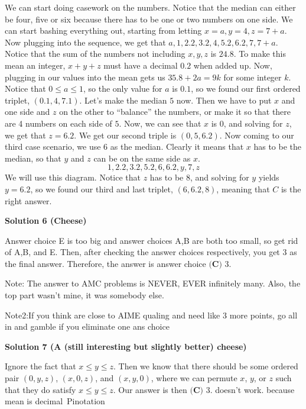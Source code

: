 \begin{enumerate}
We can start doing casework on the numbers. Notice that the median can either be four, five or six because there has to be one or two numbers on one side. We can start bashing everything out, starting from letting $x=a, y=4, z=7+a$. Now plugging into the sequence, we get that $a, 1, 2.2, 3.2, 4, 5.2, 6.2, 7, 7+a$. Notice that the sum of the numbers not including $x, y, z$ is $24.8$. To make this mean an integer, $x+y+z$ must have a decimal $0.2$ when added up. Now, plugging in our values into the mean gets us $35.8+2a=9k$ for some integer $k$. Notice that $0\leq a\leq 1$, so the only value for $a$ is $0.1$, so we found our first ordered triplet, $(0.1, 4, 7.1)$. Let’s make the median $5$ now. Then we have to put $x$ and one side and $z$ on the other to “balance” the numbers, or make it so that there are 4 numbers on each side of $5$. Now, we can see that $x$ is $0$, and solving for $z$, we get that $z=6.2$. We get our second triple is $(0, 5, 6.2)$. Now coming to our third case scenario, we use $6$ as the median. Clearly it means that $x$ has to be the median, so that $y$ and $z$ can be on the same side as $x$. 
 \[1, 2.2, 3.2, 5.2, 6, 6.2, y, 7, z\] We will use this diagram. Notice that $z$ has to be $8$, and solving for $y$ yields $y=6.2$, so we found our third and last triplet, $(6, 6.2, 8)$, meaning that $\boxed{C}$ is the right answer.

 



\textbf{Solution 6 (Cheese)}

Answer choice E is too big and answer choices A,B are both too small, so get rid of A,B, and E. Then, after checking the answer choices respectively, you get 3 as the final answer. Therefore, the answer is answer choice $\boxed{\textbf{(C) }3}$.

 
Note: The answer to AMC problems is NEVER, EVER infinitely many. Also, the top part wasn't mine, it was somebody else. 

 Note2:If you think are close to AIME qualing and need like 3 more points, go all in and gamble if you eliminate one ans choice

 



\textbf{Solution 7 (A (still interesting but slightly better) cheese)}

Ignore the fact that \( x \le y \le z \). Then we know that there should be some ordered pair \((0,y,z)\), \((x,0,z)\), and \((x,y,0)\), where we can permute \( x \), \( y \), or \( z \) such that they do satisfy \( x \le y \le z \). Our answer is then \(\boxed{\textbf{(C) }3}\). doesn't work. because mean is decimal~Pinotation


\end{enumerate}
